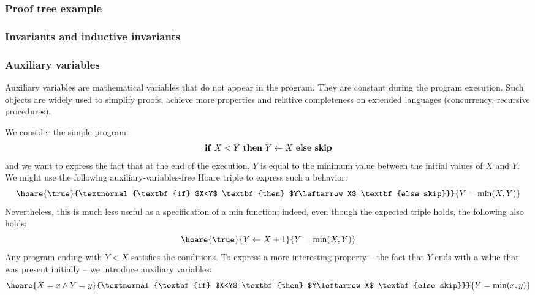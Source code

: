 \documentclass[toc, titlepaged]{../cs-classes/cs-classes}
\begin{document}
\subsubsection{Proof tree example}

\subsubsection{Invariants and inductive invariants}

\subsubsection{Auxiliary variables}
Auxiliary variables are mathematical variables that do not appear in the program. They are constant during the program execution. Such objects are widely used to simplify proofs, achieve more properties and relative completeness on extended languages (concurrency, recursive procedures). 

\begin{example}
    We consider the simple program:
    \begin{equation*}
        \textnormal{\textbf{if} $X<Y$ \textbf{then} $Y\leftarrow X$ \textbf{else skip}}
    \end{equation*}
    and we want to express the fact that at the end of the execution, $Y$ is equal to the minimum value between the initial values of $X$ and $Y$. We might use the following auxiliary-variables-free Hoare triple to express such a behavior:
    \begin{equation*}
        \hoare{\true}{\textnormal{\textbf{if} $X<Y$ \textbf{then} $Y\leftarrow X$ \textbf{else skip}}}{Y=\min(X, Y)}
    \end{equation*}
    Nevertheless, this is much less useful as a specification of a min function; indeed, even though the expected triple holds, the following also holds:
    \begin{equation*}
        \hoare{\true}{Y\leftarrow X+1}{Y=\min(X, Y)}
    \end{equation*}
    Any program ending with $Y<X$ satisfies the conditions. To express a more interesting property -- the fact that $Y$ ends with a value that was present initially -- we introduce auxiliary variables:
    \begin{equation*}
        \hoare{X=x\land Y=y}{\textnormal{\textbf{if} $X<Y$ \textbf{then} $Y\leftarrow X$ \textbf{else skip}}}{Y=\min(x, y)}
    \end{equation*}
\end{example}
\end{document}
